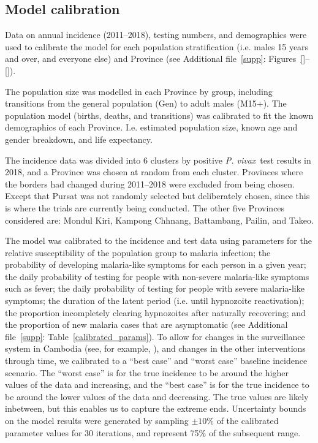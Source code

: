 \documentclass[doublespacing]{bmcart}
\newcommand{\pv}{\textit{P. vivax}}
\begin{document}
\subsection*{Model calibration} \label{sec:calibration} %

Data on annual incidence (2011--2018), testing numbers, and demographics were used to calibrate the model for each population stratification (i.e. males 15 years and over, and everyone else) and Province (see Additional file~\ref{supp}: Figures~\ref{}--\ref{}). 

The population size was modelled in each Province by group, including transitions from the general population (Gen) to adult males (M15+). The population model (births, deaths, and transitions) was calibrated to fit the known demographics of each Province. I.e. estimated population size, known age and gender breakdown, and life expectancy.

The incidence data was divided into 6 clusters by positive \pv~test results in 2018, and a Province was chosen at random from each cluster. Provinces where the borders had changed during 2011--2018 were excluded from being chosen. Except that Pursat was not randomly selected but deliberately chosen, since this is where the trials are currently being conducted. The other five Provinces considered are: Mondul Kiri, Kampong Chhnang, Battambang, Pailin, and Takeo. 

The model was calibrated to the incidence and test data using parameters for the relative susceptibility of the population group to malaria infection; the probability of developing malaria-like symptoms for each person in a given year; the daily probability of testing for people with non-severe malaria-like symptoms such as fever; the daily probability of testing for people with severe malaria-like symptoms; the duration of the latent period (i.e. until hypnozoite reactivation); the proportion incompletely clearing hypnozoites after naturally recovering; and the proportion of new malaria cases that are asymptomatic (see Additional file~\ref{supp}: Table~\ref{calibrated_params}). To allow for changes in the surveillance system in Cambodia (see, for example, \cite{Pengby}), and changes in the other interventions through time, we calibrated to a ``best case'' and ``worst case'' baseline incidence scenario. The ``worst case'' is for the true incidence to be around the higher values of the data and increasing, and the ``best case'' is for the true incidence to be around the lower values of the data and decreasing. The true values are likely inbetween, but this enables us to capture the extreme ends. Uncertainty bounds on the model results were generated by sampling $\pm10\%$ of the calibrated parameter values for 30 iterations, and represent 75\% of the subsequent range.
\end{document}
